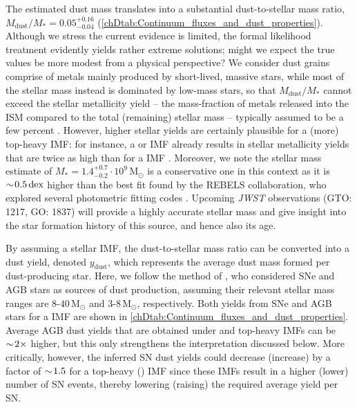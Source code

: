 The estimated dust mass translates into a substantial dust-to-stellar mass ratio, $M_\text{dust}/M_* = 0.05_{-0.04}^{+0.16}$ (\cref{chDtab:Continuum_fluxes_and_dust_properties}). Although we stress the current evidence is limited, the formal likelihood treatment evidently yields rather extreme solutions; might we expect the true values be more modest from a physical perspective? We consider dust grains comprise of metals mainly produced by short-lived, massive stars, while most of the stellar mass instead is dominated by low-mass stars, so that $M_\text{dust}/M_*$ cannot exceed the stellar metallicity yield -- the mass-fraction of metals released into the ISM compared to the total (remaining) stellar mass -- typically assumed to be a few percent . However, higher stellar yields are certainly plausible for a (more) top-heavy IMF: for instance, a \citet{2001MNRAS.322..231K} or \citet{2003PASP..115..763C} IMF already results in stellar metallicity yields that are twice as high than for a \citet{1955ApJ...121..161S} IMF \citep{2016MNRAS.455.4183V}. Moreover, we note the stellar mass estimate of $M_* = 1.4_{-0.2}^{+0.7} \cdot 10^9 \, \mathrm{M_\odot}$ \citep[taken from][]{2018Natur.553..178S} is a conservative one in this context as it is $\sim \! 0.5 \, \mathrm{dex}$ higher than the best fit found by the REBELS collaboration, who explored several photometric fitting codes \citetext{private communication, REBELS collaboration 2021; see also \citealt{2022ApJ...931..160B}}. Upcoming \textit{JWST} observations (GTO: 1217, GO: 1837) will provide a highly accurate stellar mass and give insight into the star formation history of this source, and hence also its age.

By assuming a stellar IMF, the dust-to-stellar mass ratio can be converted into a dust yield, denoted $y_\text{dust}$, which represents the average dust mass formed per dust-producing star. Here, we follow the method of \citet{2015A&A...577A..80M}, who considered SNe and AGB stars as sources of dust production, assuming their relevant stellar mass ranges are $8$-$40 \, \mathrm{M_\odot}$ and $3$-$8 \, \mathrm{M_\odot}$, respectively. Both yields from SNe and AGB stars for a \citet{2003PASP..115..763C} IMF are shown in \cref{chDtab:Continuum_fluxes_and_dust_properties}. Average AGB dust yields that are obtained under \citeauthor{1955ApJ...121..161S} and top-heavy IMFs can be $\sim \! 2 \times$ higher, but this only strengthens the interpretation discussed below. More critically, however, the inferred SN dust yields could decrease (increase) by a factor of $\sim \! 1.5$ for a top-heavy (\citeauthor{1955ApJ...121..161S}) IMF since these IMFs result in a higher (lower) number of SN events, thereby lowering (raising) the required average yield per SN.


